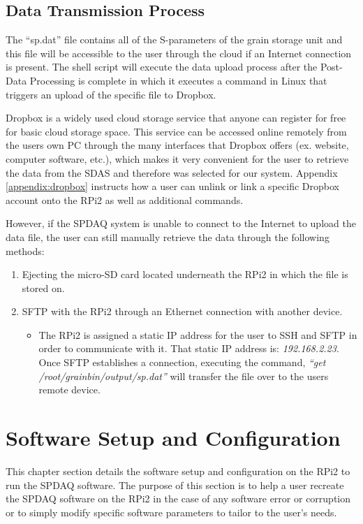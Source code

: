 \subsection{Data Transmission Process}

The “sp.dat” file contains all of the S-parameters of the grain storage unit and this file will be accessible to the user
through the cloud if an Internet connection is present.  The shell script will execute the data upload process after the
Post-Data Processing is complete in which it executes a command in Linux that triggers an upload of the specific file to
Dropbox.

Dropbox is a widely used cloud storage service that anyone can register for free for basic cloud storage space. This service
can be accessed online remotely from the users own PC through the many interfaces that Dropbox offers (ex. website, computer
software, etc.), which makes it very convenient for the user to retrieve the data from the SDAS and therefore was selected
for our system.  Appendix \ref{appendix:dropbox} instructs how a user can unlink or link a specific Dropbox account onto the RPi2 as well as
additional commands.

However, if the SPDAQ system is unable to connect to the Internet to upload the data file, the user can still manually
retrieve the data through the following methods:

\begin{enumerate}
\item Ejecting the micro-SD card located underneath the RPi2 in which the file is stored on.
\item SFTP with the RPi2 through an Ethernet connection with another device.
\begin{itemize}
\item The RPi2 is assigned a static IP address for the user to SSH and SFTP in order to communicate with it. That static IP address is: \textit{192.168.2.23}.  Once SFTP establishes a connection, executing the command, \textit{“get /root/grainbin/output/sp.dat”} will transfer the file over to the users remote device.
\end{itemize}
\end{enumerate}

\section{Software Setup and Configuration}

This chapter section details the software setup and configuration on the RPi2 to run the SPDAQ software. The purpose of this
section is to help a user recreate the SPDAQ software on the RPi2 in the case of any software error or corruption or to
simply modify specific software parameters to tailor to the user’s needs.


